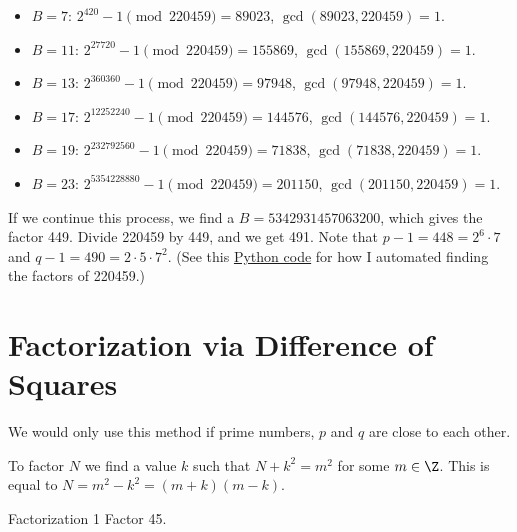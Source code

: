 {\begin{enumerate}
\begin{itemize}
                  \item \(B = 7\): \(2^{420} - 1 \pmod{220459} = 89023\), \(\gcd(89023, 220459) = 1\).
                  \item \(B = 11\): \(2^{27720} - 1 \pmod{220459} = 155869\), \(\gcd(155869, 220459) = 1\).
                  \item \(B = 13\): \(2^{360360} - 1 \pmod{220459} = 97948\), \(\gcd(97948, 220459) = 1\).
                  \item \(B = 17\): \(2^{12252240} - 1 \pmod{220459} = 144576\), \(\gcd(144576, 220459) = 1\).
                  \item \(B = 19\): \(2^{232792560} - 1 \pmod{220459} = 71838\), \(\gcd(71838, 220459) = 1\).
                  \item \(B = 23\): \(2^{5354228880} - 1 \pmod{220459} = 201150\), \(\gcd(201150, 220459) = 1\).
              \end{itemize}
              If we continue this process, we find a \(B = 5342931457063200\), which gives the factor 449. Divide 220459 by 449, and we get 491. Note that \(p - 1 = 448 = 2^6 \cdot 7\) and \(q - 1 = 490 = 2 \cdot 5 \cdot 7^2\). (See this \hyperref[pollard's p python]{Python code} for how I automated finding the factors of 220459.)
    \end{enumerate}
}



\renewcommand{\theenumi}{\arabic{enumi}}
\renewcommand{\labelenumi}{\theenumi.}
\section{Factorization via Difference of Squares}

We would only use this method if prime numbers, \(p\) and \(q\) are close to each other.

To factor \(N\) we find a value \(k\) such that \(N + k^2 = m^2\) for some \(m \in \Z\). This is equal to \(N = m^2 - k^2 = (m+k)(m-k)\).

\begin{example}
    {Factorization 1} Factor 45.
\end{example}



